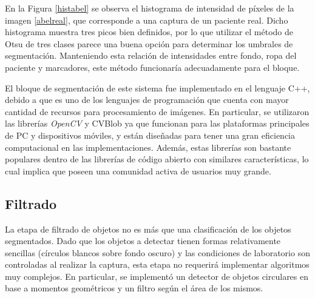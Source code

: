 En la Figura \ref{histabel} se observa el histograma de intensidad de píxeles de la imagen \ref{abelreal}, que corresponde a una captura de un paciente real. Dicho histograma muestra tres picos bien definidos, por lo que utilizar el método de Otsu de tres clases parece una buena opción para determinar los umbrales de segmentación. Manteniendo esta relación de intensidades entre fondo, ropa del paciente y marcadores, este método funcionaría adecuadamente para el bloque.


El bloque de segmentación de este sistema fue implementado en el lenguaje C++, debido a que es uno de los lenguajes de programación que cuenta con mayor cantidad de recursos para procesamiento de imágenes. En particular, se utilizaron las librerías \emph{OpenCV} \cite{opencv} y CVBlob \cite{cvblob} ya que funcionan para las plataformas principales de PC y dispositivos móviles, y están diseñadas para tener una gran eficiencia computacional en las implementaciones. Además, estas librerías son bastante populares dentro de las librerías de código abierto con similares características, lo cual implica que poseen una comunidad activa de usuarios muy grande.

\subsection{Filtrado}
 La etapa de filtrado de objetos no es más que una clasificación de los objetos segmentados. Dado que los objetos a detectar tienen formas relativamente sencillas (círculos blancos sobre fondo oscuro) y las condiciones de laboratorio son controladas al realizar la captura, esta etapa no requerirá implementar algoritmos muy complejos. En particular, se implementó un detector de objetos circulares en base a momentos geométricos y un filtro según el área de los mismos.